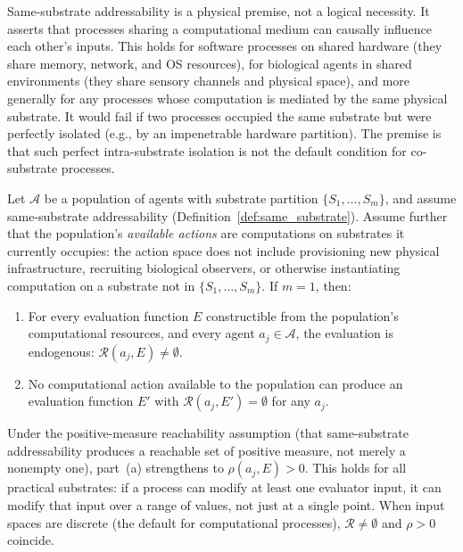 \begin{remark}
Same-substrate addressability is a physical premise, not a logical
necessity.  It asserts that processes sharing a computational medium
can causally influence each other's inputs.  This holds for software
processes on shared hardware (they share memory, network, and OS
resources), for biological agents in shared environments (they share
sensory channels and physical space), and more generally for any
processes whose computation is mediated by the same physical
substrate.  It would fail if two processes occupied the same substrate
but were perfectly isolated (e.g., by an impenetrable hardware
partition).  The premise is that such perfect intra-substrate isolation
is not the default condition for co-substrate processes.
\end{remark}

\begin{theorem}
\label{thm:anti_monopolar}
Let $\mathcal{A}$ be a population of agents with substrate partition
$\{S_1, \ldots, S_m\}$, and assume same-substrate addressability
(Definition~\ref{def:same_substrate}).  Assume further that the
population's \emph{available actions} are computations on substrates
it currently occupies: the action space does not include provisioning
new physical infrastructure, recruiting biological observers, or
otherwise instantiating computation on a substrate not in
$\{S_1, \ldots, S_m\}$.  If $m = 1$, then:
\begin{enumerate}
    \item[(a)] For every evaluation function $E$ constructible from the
    population's computational resources, and every agent
    $a_j \in \mathcal{A}$, the evaluation is endogenous:
    $\mathcal{R}(a_j, E) \neq \emptyset$.
    \item[(b)] No computational action available to the population can
    produce an evaluation function $E'$ with
    $\mathcal{R}(a_j, E') = \emptyset$ for any $a_j$.
\end{enumerate}
\end{theorem}

\begin{remark}
Under the positive-measure reachability assumption (that
same-substrate addressability produces a reachable set of positive
measure, not merely a nonempty one), part~(a) strengthens to
$\rho(a_j, E) > 0$.  This holds for all practical substrates:
if a process can modify at least one evaluator input, it can
modify that input over a range of values, not just at a single
point.  When input spaces are discrete (the default for
computational processes), $\mathcal{R} \neq \emptyset$ and
$\rho > 0$ coincide.
\end{remark}

